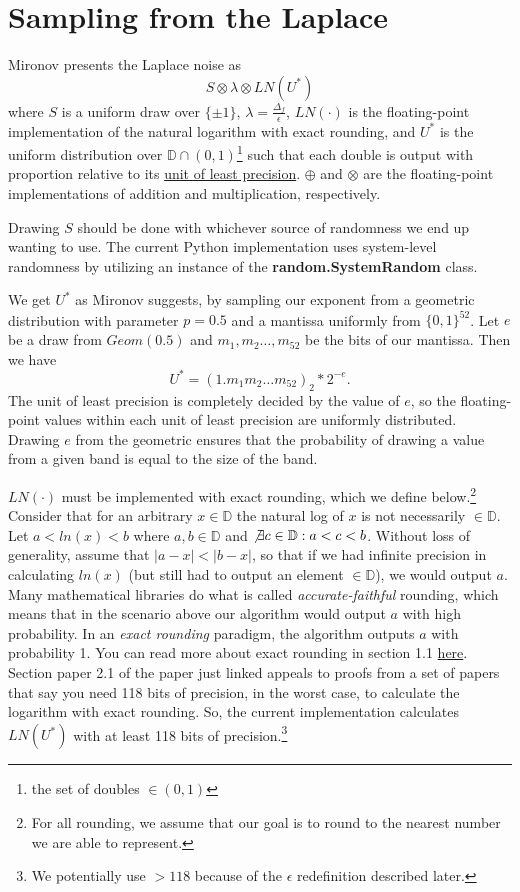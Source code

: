 \documentclass[11pt]{scrartcl} %
\begin{document}
\section{Sampling from the Laplace}
Mironov presents the Laplace noise as
\[ S \otimes \lambda \otimes LN(U^*) \]
where $S$ is a uniform draw over $\{\pm 1\}$, $\lambda = \frac{\Delta_f}{\epsilon}$, $LN(\cdot)$ is the floating-point implementation of the natural logarithm with exact rounding, and $U^*$ is the uniform distribution over $\mathbb{D} \cap (0,1)$\footnote{the set of doubles $\in (0,1)$} such that each double is output with proportion relative to its \href{https://en.wikipedia.org/wiki/Unit_in_the_last_place}{unit of least precision}. $\oplus$ and $\otimes$ are the floating-point implementations of addition and multiplication, respectively. \newline

Drawing $S$ should be done with whichever source of randomness we end up wanting to use. The current Python implementation uses system-level randomness by utilizing an instance of the \textbf{random.SystemRandom} class. \newline

We get $U^*$ as Mironov suggests, by sampling our exponent from a geometric distribution with parameter $p = 0.5$ and a mantissa uniformly from $\{0,1\}^{52}$. Let $e$ be a draw from $Geom(0.5)$ and $m_1, m_2 \hdots, m_{52}$ be the bits of our mantissa. Then we have
\[ U^{*} = (1.m_1m_2 \hdots m_{52})_2 * 2^{- e}. \]
The unit of least precision is completely decided by the value of $e$, so the floating-point values within each unit of least precision are uniformly distributed. Drawing $e$ from the geometric ensures that the probability of drawing a value from a given band is equal to the size of the band. \newline

$LN(\cdot)$ must be implemented with exact rounding, which we define below.\footnote{For all rounding, we assume that our goal is to round to the nearest number we are able to represent.} Consider that for an arbitrary $x \in \mathbb{D}$ the natural log of $x$ is not necessarily $\in \mathbb{D}$. Let $a < ln(x) < b$ where $a,b \in \mathbb{D}$ and $\not\exists c \in \mathbb{D}: a < c < b$. Without loss of generality, assume that $\vert a-x \vert < \vert b - x \vert$, so that if we had infinite precision in calculating $ln(x)$ (but still had to output an element $\in \mathbb{D}$), we would output $a$.
Many mathematical libraries do what is called \textit{accurate-faithful} rounding, which means that in the scenario above our algorithm would output $a$ with high probability. In an \textit{exact rounding} paradigm, the algorithm outputs $a$ with probability 1. You can read more about exact rounding in section 1.1 \href{http://www.ens-lyon.fr/LIP/Pub/Rapports/RR/RR2005/RR2005-37.pdf}{here}. Section paper 2.1 of the paper just linked appeals to proofs from a set of papers that say you need 118 bits of precision, in the worst case, to calculate the logarithm with exact rounding. So, the current implementation calculates $LN(U^*)$ with at least 118 bits of precision.\footnote{We potentially use $> 118$ because of the $\epsilon$ redefinition described later.} \newline
\end{document}
